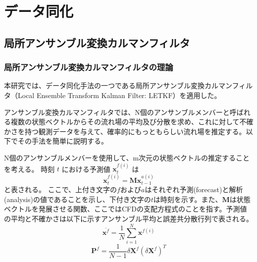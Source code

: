 \documentclass[./Main.tex]{subfiles}
\begin{document}
\chapter{データ同化}
\section{局所アンサンブル変換カルマンフィルタ}
\subsection{局所アンサンブル変換カルマンフィルタの理論}
本研究では、データ同化手法の一つである局所アンサンブル変換カルマンフィルタ（Local Ensemble Transform Kalman Filter: LETKF）を適用した\cite{Hunt2007}。

アンサンブル変換カルマンフィルタでは、N個のアンサンブルメンバーと呼ばれる複数の状態ベクトルからその流れ場の平均及び分散を求め、これに対して不確かさを持つ観測データを与えて、確率的にもっともらしい流れ場を推定する。以下でその手法を簡単に説明する。

N個のアンサンブルメンバーを使用して、m次元の状態ベクトルの推定することを考える。
時刻 $t$ における予測値 $\bm{x}^{f(i)}_t$ は
\begin{equation}
\bm{x}^{f(i)}_t = \bm{M}\bm{x}^{a(i)}_{t-1}
\end{equation}
と表される。
ここで、上付き文字の$f$および$a$はそれぞれ予測(forecast)と解析(analysis)の値であることを示し、下付き文字の$t$は時刻を示す。また、$\bm{M}$は状態ベクトルを発展させる関数、ここではCFDの支配方程式のことを指す。予測値の平均と不確かさは以下に示すアンサンブル平均と誤差共分散行列で表される。
\begin{equation}
\overline{\bm{x}^{f}} = \frac{1}{N}\sum_{i=1}^{N}\bm{x}^{f(i)}
\end{equation}
\begin{equation}
\bm{P}^{f} = \frac{1}{N-1}\delta\bm{X}^{f}(\delta\bm{X}^{f})^{T}
\end{equation}



\ifSubfilesClassLoaded{


}{}
\end{document}
